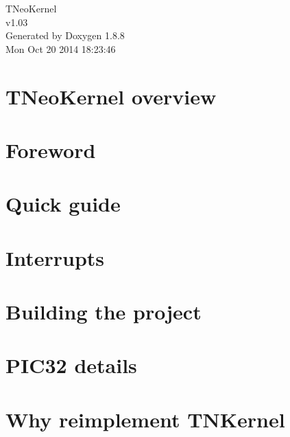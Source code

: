 \documentclass[twoside]{book}
\newcommand{\+}{\discretionary{\mbox{\scriptsize$\hookleftarrow$}}{}{}}
\newcommand{\clearemptydoublepage}{%
  \newpage{\pagestyle{empty}\cleardoublepage}%
}
\begin{document}
\hypersetup{pageanchor=false,
             bookmarks=true,
             bookmarksnumbered=true,
             pdfencoding=unicode
            }
\begin{titlepage}
\vspace*{7cm}
\begin{center}%
{\Large T\+Neo\+Kernel \\[1ex]\large v1.\+03 }\\
\vspace*{1cm}
{\large Generated by Doxygen 1.8.8}\\
\vspace*{0.5cm}
{\small Mon Oct 20 2014 18:23:46}\\
\end{center}
\end{titlepage}
\clearemptydoublepage
\tableofcontents
\clearemptydoublepage
{}
\hypersetup{pageanchor=true}

\chapter{T\+Neo\+Kernel overview}
\label{index}\hypertarget{index}{}
\chapter{Foreword}
\label{foreword}
\hypertarget{foreword}{}

\chapter{Quick guide}
\label{quick_guide}
\hypertarget{quick_guide}{}

\chapter{Interrupts}
\label{interrupts}
\hypertarget{interrupts}{}

\chapter{Building the project}
\label{building}
\hypertarget{building}{}

\chapter{P\+I\+C32 details}
\label{pic32_details}
\hypertarget{pic32_details}{}

\chapter{Why reimplement T\+N\+Kernel}
\label{why_reimplement}
\hypertarget{why_reimplement}{}

\end{document}
